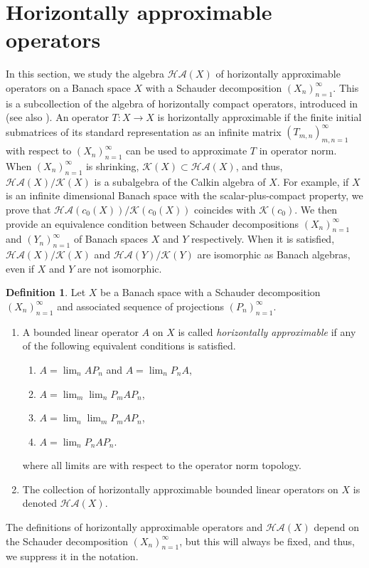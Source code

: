 \documentclass[11pt]{amsart}
\theoremstyle{definition}
\newtheorem{definition}[theorem]{Definition}
\numberwithin{equation}{section}
\begin{document}
\section{Horizontally approximable operators}
In this section, we study the algebra $\mathcal{HA}(X)$ of horizontally approximable operators on a Banach space $X$ with a Schauder decomposition $(X_n)_{n=1}^\infty$. This is a subcollection of the algebra of horizontally compact operators, introduced in \cite[Definition 7.1]{zisimopoulou:2014} (see also ). An operator $T:X\to X$ is horizontally approximable if the finite initial submatrices of its standard representation as an infinite matrix $(T_{m,n})_{m,n=1}^\infty$ with respect to $(X_n)_{n=1}^\infty$ can be used to approximate $T$ in operator norm. When $(X_n)_{n=1}^\infty$ is shrinking, $\mathcal{K}(X)\subset\mathcal{HA}(X)$, and thus, $\mathcal{HA}(X)/\mathcal{K}(X)$ is a subalgebra of the Calkin algebra of $X$. For example, if $X$ is an infinite dimensional Banach space with the scalar-plus-compact property, we prove that $\mathcal{HA}(c_0(X))/\mathcal{K}(c_0(X))$ coincides with $\mathcal{K}(c_0)$. We then provide an equivalence condition between Schauder decompositions $(X_n)_{n=1}^\infty$ and $(Y_n)_{n=1}^\infty$ of Banach spaces $X$ and $Y$ respectively. When it is satisfied, $\mathcal{HA}(X)/\mathcal{K}(X)$ and $\mathcal{HA}(Y)/\mathcal{K}(Y)$ are isomorphic as Banach algebras, even if $X$ and $Y$ are not isomorphic.

\begin{definition}
Let $X$ be a Banach space with a Schauder decomposition $(X_n)_{n=1}^\infty$ and associated sequence of projections $(P_n)_{n=1}^\infty$.
\begin{enumerate}[leftmargin=19pt,label=(\alph*)]
    
\item A bounded linear operator $A$ on $X$ is called {\em horizontally approximable} if any of the following equivalent conditions is satisfied.\vskip6pt
\begin{enumerate}[label=(\greek*)]
    \item $A = \lim_n AP_n$ and  $A = \lim_nP_nA$,\vskip6pt
    \item $A = \lim_m\lim_nP_mAP_n$,\vskip6pt
    \item $A = \lim_n\lim_mP_mAP_n$,\vskip6pt
    \item $A = \lim_nP_nAP_n$.\vskip6pt
\end{enumerate}
where all limits are with respect to the operator norm topology.

\item The collection of horizontally approximable bounded linear operators on $X$ is denoted $\mathcal{HA}(X)$.

\end{enumerate}
The definitions of horizontally approximable operators and $\mathcal{HA}(X)$ depend on the Schauder decomposition $(X_n)_{n=1}^\infty$, but this will always be fixed, and thus, we suppress it in the notation.
\end{definition}
\end{document}
